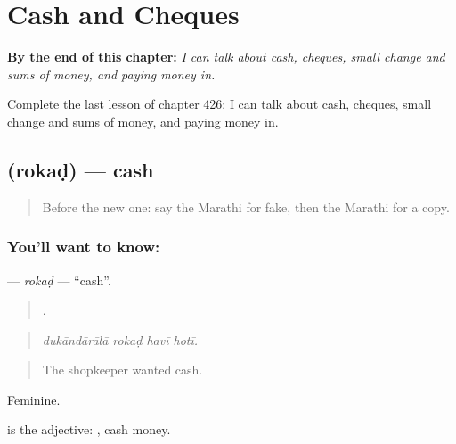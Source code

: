 
\chapter{Cash and Cheques}
\label{ch:mr-cash-and-cheques}

\begin{chapteropening}
\textbf{By the end of this chapter:} \emph{I can talk about cash, cheques, small change and sums of money, and paying money in.}

Complete the last lesson of chapter 426: I can talk about cash, cheques, small change and sums of money, and paying money in.
\end{chapteropening}

\section[\texorpdfstring{\mr{रोकड} (rokaḍ)}{रोकड (rokaḍ)}]{ (rokaḍ) — cash}

\label{lesson:MR-C426-rokad}



\begin{quote}
Before the new one: say the Marathi for fake, then the Marathi for a copy.
\end{quote}

\subsection*{You'll want to know: }
\textbf{} — \emph{rokaḍ} — \textquotedblleft{}cash\textquotedblright{}.

\begin{quote}
   .
\end{quote}

\begin{quote}
\emph{dukāndārālā rokaḍ havī hotī.}
\end{quote}

\begin{quote}
The shopkeeper wanted cash.
\end{quote}

Feminine.

 is the adjective:  , cash money.

